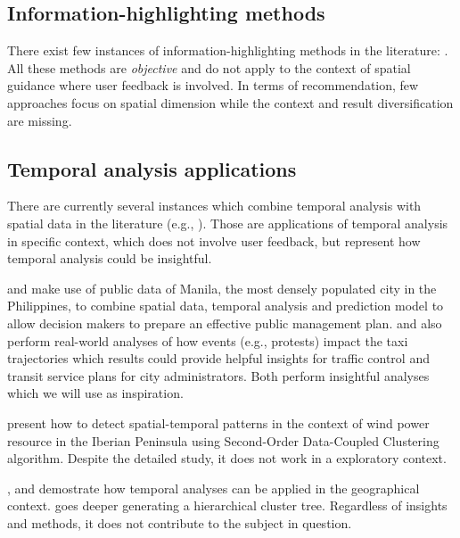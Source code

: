 \subsection{Information-highlighting methods}

There exist few instances of information-highlighting methods in the literature: . All these methods are {\em objective} and do not apply to the context of spatial guidance where user feedback is involved. In terms of recommendation, few approaches focus on spatial dimension \cite{Bao2015,Levandoski:2012} while the context and result diversification are missing.

\subsection{Temporal analysis applications}

There are currently several instances which combine temporal analysis with spatial data in the literature (e.g., ). Those are applications of temporal analysis in specific context, which does not involve user feedback, but represent how temporal analysis could be insightful.

 and  make use of public data of Manila, the most densely populated city in the Philippines, to combine spatial data, temporal analysis and prediction model to allow decision makers to prepare an effective public management plan.  and  also perform real-world analyses of how events (e.g., protests) impact the taxi trajectories which results could provide helpful insights for traffic control and transit service plans for city administrators. Both perform insightful analyses which we will use as inspiration.

 present how to detect spatial-temporal patterns in the context of wind power resource in the Iberian Peninsula using Second-Order Data-Coupled Clustering algorithm. Despite the detailed study, it does not work in a exploratory context.

,  and  demostrate how temporal analyses can be applied in the geographical context.  goes deeper generating a hierarchical cluster tree. Regardless of insights and methods, it does not contribute to the subject in question.

